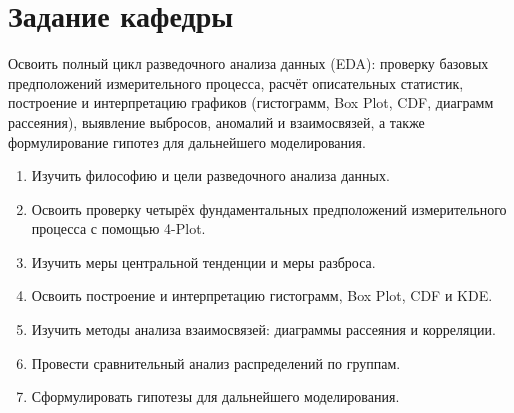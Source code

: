 \pagestyle{empty}
\section*{Задание кафедры}




Освоить полный цикл разведочного анализа данных (EDA): проверку базовых предположений измерительного процесса, расчёт описательных статистик, построение и интерпретацию графиков (гистограмм, Box Plot, CDF, диаграмм рассеяния), выявление выбросов,
аномалий и взаимосвязей, а также формулирование гипотез для дальнейшего моделирования.

\begin{enumerate}
    \item Изучить философию и цели разведочного анализа данных.
 
    \item Освоить проверку четырёх фундаментальных предположений измерительного процесса с помощью 4-Plot.
 
    \item Изучить меры центральной тенденции и меры разброса.
 
    \item Освоить построение и интерпретацию гистограмм,
    Box Plot, CDF и KDE.
 
    \item Изучить методы анализа взаимосвязей: диаграммы рассеяния и корреляции.
 
    \item Провести сравнительный анализ распределений по группам.
 
    \item Сформулировать гипотезы для дальнейшего моделирования.
\end{enumerate}